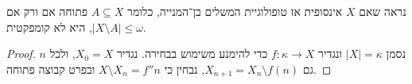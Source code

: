 \question{}
נראה שאם $X$ אינסופית אז טופולוגיית המשלים בן־המנייה,
כלומר $A \subseteq X$ פתוחה אם ורק אם $|X \setminus A| \le \omega$,
היא לא קומפקטית.
\begin{proof}
	נסמן $|X| = \kappa$ ונגדיר $f : \kappa \to X$ כדי להימנע משימוש בבחירה.
	נגדיר $X_0 = X$, ולכל $n$ גם $X_{n + 1} = X_n \setminus f(n)$, נבחין כי $X \setminus X_n = f '' n$ ובפרט קבוצה פתוחה.
\end{proof}


